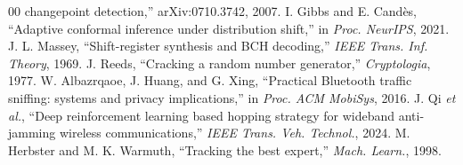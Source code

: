 \documentclass[conference]{IEEEtran}
\begin{document}
\begin{thebibliography}{00}
changepoint detection,'' arXiv:0710.3742, 2007.
 I. Gibbs and E. Cand\`es, ``Adaptive conformal inference
under distribution shift,'' in \emph{Proc. NeurIPS}, 2021.
 J. L. Massey, ``Shift-register synthesis and BCH
decoding,'' \emph{IEEE Trans. Inf. Theory}, 1969.
 J. Reeds, ``Cracking a random number generator,''
\emph{Cryptologia}, 1977.
 W. Albazrqaoe, J. Huang, and G. Xing, ``Practical
Bluetooth traffic sniffing: systems and privacy implications,'' in
\emph{Proc. ACM MobiSys}, 2016.
 J. Qi \emph{et al.}, ``Deep reinforcement learning based
hopping strategy for wideband anti-jamming wireless communications,''
\emph{IEEE Trans. Veh. Technol.}, 2024.
 M. Herbster and M. K. Warmuth, ``Tracking the best
expert,'' \emph{Mach. Learn.}, 1998.
\end{thebibliography}
\end{document}
